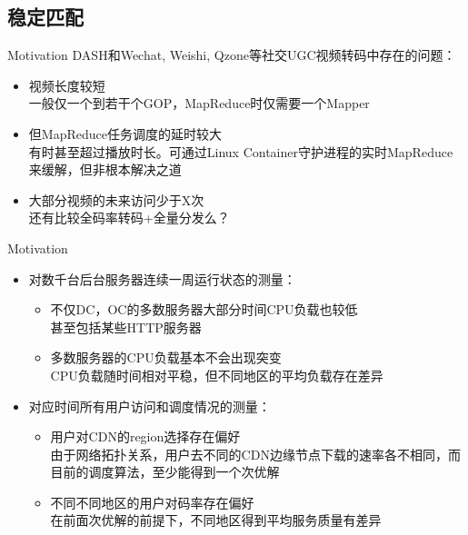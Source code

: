 \documentclass{beamer}
\begin{document}
\subsection{稳定匹配}
\begin{frame}{Motivation}
DASH和Wechat, Weishi, Qzone等社交UGC视频转码中存在的问题：
\begin{itemize}
\item 视频长度较短\\
一般仅一个到若干个GOP，MapReduce时仅需要一个Mapper
\item 但MapReduce任务调度的延时较大\\
有时甚至超过播放时长。可通过Linux Container守护进程的实时MapReduce来缓解，但非根本解决之道
\item 大部分视频的未来访问少于X次\\
还有比较全码率转码+全量分发么？
\end{itemize}
\end{frame}
\begin{frame}{Motivation}
\begin{itemize}
	\item 对数千台后台服务器连续一周运行状态的测量：\\
		\begin{itemize}
		\item 不仅DC，OC的多数服务器大部分时间CPU负载也较低\\
		甚至包括某些HTTP服务器
		\item 多数服务器的CPU负载基本不会出现突变\\
		CPU负载随时间相对平稳，但不同地区的平均负载存在差异
		\end{itemize}
	\item 对应时间所有用户访问和调度情况的测量：\\
		\begin{itemize}
		\item 用户对CDN的region选择存在偏好\\
		由于网络拓扑关系，用户去不同的CDN边缘节点下载的速率各不相同，而目前的调度算法，至少能得到一个次优解
		\item 不同不同地区的用户对码率存在偏好\\
		在前面次优解的前提下，不同地区得到平均服务质量有差异
	\end{itemize}
\end{itemize}
\end{frame}
\end{document}
